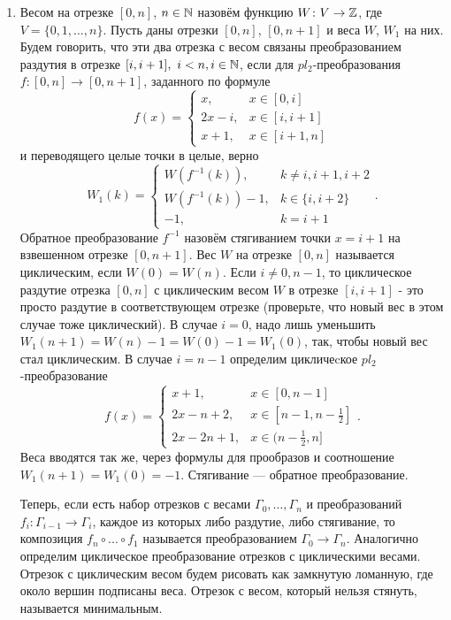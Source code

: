 \begin{enumerate}
\item Весом на отрезке $[0,n]$, $n\in\mathbb{N}$ назовём функцию $W\colon V\to\mathbb{Z}$, где $V=\{0, 1, \dots, n\}$. Пусть даны отрезки $[0,n]$, $[0,n+1]$ и веса $W$, $W_1$ на них. Будем говорить, что эти два отрезка с весом связаны преобразованием раздутия в отрезке  $[i,i+1],\,\, i<n, i\in\mathbb{N}$, если для $pl_2$-преобразования $f\colon [0,n] \to [0,n+1]$, заданного по формуле
$$f(x)=\begin{cases}
x,& x\in[0,i]\\
2x-i,& x\in[i,i+1]\\
x + 1,& x\in[i+1,n]
\end{cases}
$$
и переводящего целые точки в целые, верно
$$
W_1(k)=\begin{cases}
W(f^{-1}(k)),&  k\neq i, {i+1}, {i+2}\\
W(f^{-1}(k))-1,&  k\in\{i, i+2\}\\
-1,& k=i+1
\end{cases}.
$$
Обратное преобразование $f^{-1}$ назовём стягиванием точки $x=i+1$ на взвешенном отрезке $[0,n+1]$.
Вес $W$ на отрезке $[0,n]$ называется циклическим, если $W(0)=W(n)$. Если $i\neq 0,n-1$, то циклическое раздутие отрезка $[0,n]$ с циклическим весом $W$ в отрезке $[i,i+1]$ - это просто раздутие в соответствующем отрезке (проверьте, что новый вес в этом случае тоже циклический). В случае $i=0$, надо лишь уменьшить $W_1(n+1)=W(n)-1=W(0)-1=W_1(0)$, так, чтобы новый вес стал циклическим. В случае $i=n-1$ определим цикличеcкое $pl_2$-преобразование 
$$f(x)=\begin{cases}
x+1,& x\in[0,n-1]\\
2x-n+2,& x\in[n-1,n-\frac{1}{2}]\\
2x-2n+1,& x\in(n-\frac{1}{2},n]
\end{cases}.
$$
Веса вводятся так же, через формулы для прообразов и соотношение $W_1(n+1)=W_1(0)=-1$. Стягивание --- обратное преобразование.

 Теперь, если есть набор отрезков с весами  $\Gamma_0, \dots, \Gamma_n$ и преобразований $f_i\colon \Gamma_{i-1}\to\Gamma_{i}$, каждое из которых либо раздутие, либо стягивание, то композиция $f_n\circ ... \circ f_1$ называется преобразованием $\Gamma_0 \to \Gamma_n$. Аналогично определим циклическое преобразование отрезков с циклическими весами.
Отрезок с циклическим весом будем рисовать как замкнутую ломанную, где около вершин подписаны веса. 
Отрезок с весом, который нельзя стянуть, называется минимальным.


\end{enumerate}
